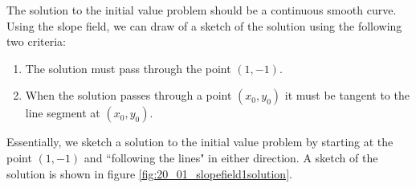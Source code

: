 
{The solution to the initial value problem should be a continuous smooth curve.  Using the slope field, we can draw of a sketch of the solution using the following two criteria:

\begin{enumerate}
\item The solution must pass through the point $(1,-1)$.
\item When the solution passes through a point $(x_0,y_0)$ it must be tangent to the line segment at $(x_0,y_0)$.
\end{enumerate}
Essentially, we sketch a solution to the initial value problem by starting at the point $(1,-1)$ and ``following the lines" in either direction.  A sketch of the solution is shown in figure \ref{fig:20_01_slopefield1solution}.
}\\





